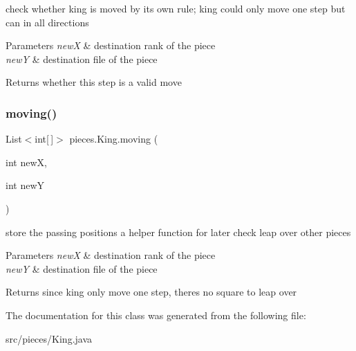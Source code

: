 check whether king is moved by its own rule; king could only move one step but can in all directions 
\begin{DoxyParams}{Parameters}
{\em newX} & destination rank of the piece \\
\hline
{\em newY} & destination file of the piece \\
\hline
\end{DoxyParams}
\begin{DoxyReturn}{Returns}
whether this step is a valid move 
\end{DoxyReturn}
\mbox{\label{classpieces_1_1_king_a8cadd535c0a47713806bb65c975f2233}} 
\subsubsection{\texorpdfstring{moving()}{moving()}}
{\footnotesize\ttfamily List$<$int\mbox{[}$\,$\mbox{]}$>$ pieces.\+King.\+moving (\begin{DoxyParamCaption}\item[{int}]{newX,  }\item[{int}]{newY }\end{DoxyParamCaption})\hspace{0.3cm}{\ttfamily [inline]}}

store the passing positions a helper function for later check leap over other pieces 
\begin{DoxyParams}{Parameters}
{\em newX} & destination rank of the piece \\
\hline
{\em newY} & destination file of the piece \\
\hline
\end{DoxyParams}
\begin{DoxyReturn}{Returns}
since king only move one step, there\textquotesingle{}s no square to leap over 
\end{DoxyReturn}


The documentation for this class was generated from the following file\+:\begin{DoxyCompactItemize}
\item 
src/pieces/King.\+java\end{DoxyCompactItemize}
